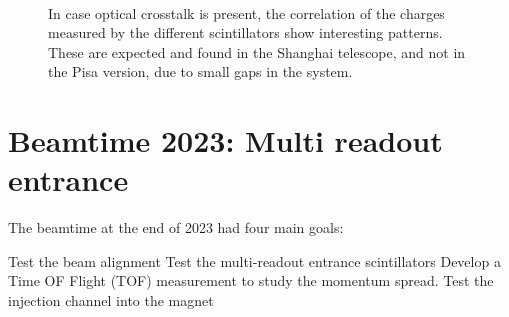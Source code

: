 \begin{refsection}
\begin{figure}
            \\
            \caption[muEDM:2022 optical crosstalk]{In case optical crosstalk is present, the correlation of the charges measured by the different scintillators show interesting patterns. These are expected and found in the Shanghai telescope, and not in the Pisa version, due to small gaps in the system.}
            \label{fig:muEDM:bt2022:blobs}
        \end{figure}

\section{Beamtime 2023: Multi readout entrance}
\label{sec:muEDM:beamtime2023}
    The beamtime at the end of 2023 had four main goals:
    \begin{outline}
        \1 Test the beam alignment
        \1 Test the multi-readout entrance scintillators
        \1 Develop a Time OF Flight (TOF) measurement to study the momentum spread.
        \1 Test the injection channel into the magnet
    \end{outline}


\end{refsection}
